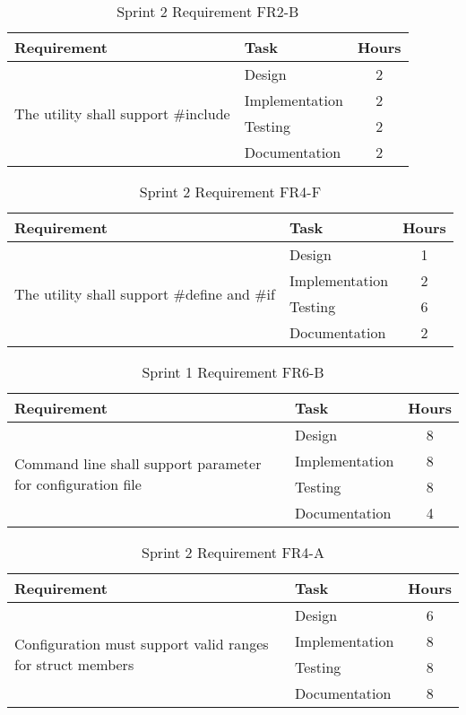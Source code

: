 \begin{table}[!ht] \small \center
\caption{Sprint 2 Requirement FR2-B\label{tab:sp2_req2b}}
\begin{tabular}{l l c}
	\toprule
	Requirement & Task & Hours \\
	\midrule
	\multirow{4}{5cm}{The utility shall support \#include} & Design & 2 \\
	& Implementation & 2 \\
	& Testing & 2 \\
	& Documentation & 2 \\
	\bottomrule
\end{tabular}
\end{table}

\begin{table}[!ht] \small \center
\caption{Sprint 2 Requirement FR4-F\label{tab:sp1_req4f}}
\begin{tabular}{l l c}
	\toprule
	Requirement & Task & Hours \\
	\midrule
	\multirow{4}{5cm}{The utility shall support \#define and \#if} & Design & 1 \\
	& Implementation & 2 \\
	& Testing & 6 \\
	& Documentation & 2 \\
	\bottomrule
\end{tabular}
\end{table}

\begin{table}[!ht] \small \center
\caption{Sprint 1 Requirement FR6-B\label{tab:sp1_req7b}}
\begin{tabular}{l l c}
	\toprule
	Requirement & Task & Hours \\
	\midrule
	\multirow{4}{5cm}{Command line shall support parameter for configuration file} & Design & 8 \\
	& Implementation & 8 \\
	& Testing & 8 \\
	& Documentation & 4 \\
	\bottomrule
\end{tabular}
\end{table}

\begin{table}[!ht] \small \center
\caption{Sprint 2 Requirement FR4-A\label{tab:sp1_req4a}}
\begin{tabular}{l l c}
	\toprule
	Requirement & Task & Hours \\
	\midrule
	\multirow{4}{5cm}{Configuration must support valid ranges for struct members} & Design & 6 \\
	& Implementation & 8 \\
	& Testing & 8 \\
	& Documentation & 8 \\
	\bottomrule
\end{tabular}
\end{table}

